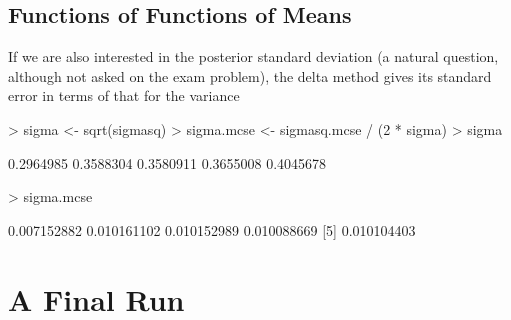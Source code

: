 \documentclass{article}
\begin{document}
\subsection{Functions of Functions of Means}

If we are also interested in the posterior standard deviation
(a natural question, although not asked on the exam problem),
the delta method gives its standard error in terms of that
for the variance
\begin{Schunk}
\begin{Sinput}
> sigma <- sqrt(sigmasq)
> sigma.mcse <- sigmasq.mcse / (2 * sigma)
> sigma
\end{Sinput}
\begin{Soutput}
[1] 0.2964985 0.3588304 0.3580911 0.3655008 0.4045678
\end{Soutput}
\begin{Sinput}
> sigma.mcse
\end{Sinput}
\begin{Soutput}
[1] 0.007152882 0.010161102 0.010152989 0.010088669
[5] 0.010104403
\end{Soutput}
\end{Schunk}

\section{A Final Run}
\end{document}

